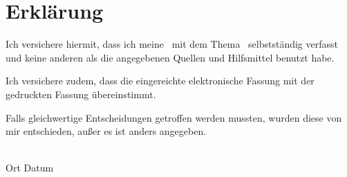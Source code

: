 \chapter*{Erklärung}
\label{ch:erklaerung}

Ich versichere hiermit, dass ich meine 
\makeatletter
\@project
\makeatother
\ mit dem Thema 
\makeatletter
\glqq{}\@title\grqq{}
\makeatother
\ selbstständig verfasst und keine anderen als die angegebenen Quellen und Hilfsmittel benutzt habe.

Ich versichere zudem, dass die eingereichte elektronische Fassung mit der gedruckten Fassung übereinstimmt.

Falls gleichwertige Entscheidungen getroffen werden mussten, wurden diese von mir
entschieden, außer es ist anders angegeben.

\vspace{2.0cm}
\underline{\hspace{12cm}}\\
Ort \hspace{3cm} Datum \hspace{2cm} 
\makeatletter
\@author
\makeatother